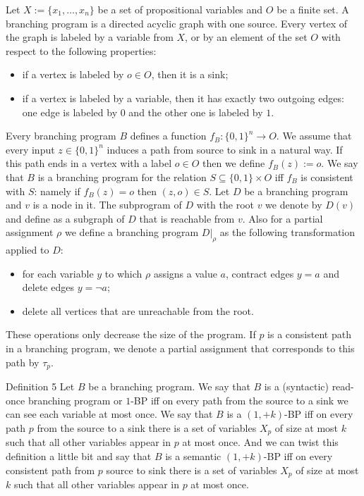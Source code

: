 Let $X:=\{x_1,\ldots,x_n\}$ be a set of propositional variables and $O$ be a finite set. A branching program is a directed acyclic graph with one source. Every vertex of the graph is labeled by a variable from $X$, or by an element of the set $O$ with respect to the following properties:
\begin{itemize}\item if a vertex is labeled by $o\in O$, then it is a sink;
\item if a vertex is labeled by a variable, then it has exactly two outgoing edges: one edge is labeled by $0$ and the other one is labeled by $1$.\end{itemize}
Every branching program $B$ defines a function $f_B:\{0,1\}^n\to O$. We assume that every input $z\in\{0,1\}^n$ induces a path from source to sink in a natural way. If this path ends in a vertex with a label $o\in O$ then we define $f_B(z):=o$.
We say that $B$ is a branching program for the relation $S\subseteq\{0,1\}\times O$ iff $f_B$ is consistent with $S$: namely if $f_B(z)=o$ then $(z,o)\in S$.
Let $D$ be a branching program and $v$ is a node in it. The subprogram of $D$ with the root $v$ we denote by $D(v)$ and define as a subgraph of $D$ that is reachable from $v$. Also for a partial assignment $\rho$ we define a branching program $D|_\rho$ as the following transformation applied to $D$:
\begin{itemize}\item for each variable $y$ to which $\rho$ assigns a value $a$, contract edges $y=a$ and delete edges $y=\neg a$;
\item delete all vertices that are unreachable from the root.\end{itemize}
These operations only decrease the size of the program.
If $p$ is a consistent path in a branching program, we denote a partial assignment that corresponds to this path by $\tau_p$.
\begin{result}{Definition 5}
Let $B$ be a branching program. We say that $B$ is a (syntactic) read-once branching program or $1$-BP iff on every path from the source to a sink we can see each variable at most once.
We say that $B$ is a $(1,+k)$-BP iff on every path $p$ from the source to a sink there is a set of variables $X_p$ of size at most $k$ such that all other variables appear in $p$ at most once.
And we can twist this definition a little bit and say that $B$ is a semantic $(1,+k)$-BP iff on every consistent path from $p$ source to sink there is a set of variables $X_p$ of size at most $k$ such that all other variables appear in $p$ at most once.
\end{result}
